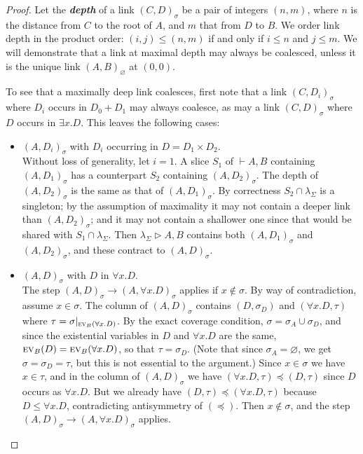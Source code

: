 \documentclass[UKenglish]{lipics-v2016}
\theoremstyle{plain}
\newcommand\defn[1]{\textit{\textbf{#1}}}
\newcommand\ex[2][{}]{\textsc{ev}_{#1}(#2)}
\newcommand\+{+}
\renewcommand\*{\times}
\newcommand\sub{\leq}
\newcommand\dep{\preccurlyeq}
\newcommand\seq[2]{{\vdash}#1,#2}
\newcommand\net[3]{#1\triangleright #2,#3}
\newcommand\res[1]{|_{#1}}
\newcommand\link[3][\sigma]{(#2,#3)_{#1}}
\newcommand\scoal{\rightarrow} %
\begin{document}
\begin{proof}
Let the \defn{depth} of a link $\link CD$ be a pair of integers $(n,m)$, where $n$ is the distance from $C$ to the root of $A$, and $m$ that from $D$ to $B$. We order link depth in the product order: $(i,j)\leq(n,m)$ if and only if $i\leq n$ and $j\leq m$. We will demonstrate that a link at maximal depth may always be coalesced, unless it is the unique link $\link[\varnothing]AB$ at $(0,0)$. 

To see that a maximally deep link coalesces, first note that a link $\link C{D_i}$ where $D_i$ occurs in $D_0{\+}D_1$ may always coalesce, as may a link $\link CD$ where $D$ occurs in $\exists x.D$. This leaves the following cases:
\begin{itemize}
	\item 
$\link A{D_i}$ with $D_i$ occurring in $D=D_1\*D_2$.
\\ 
Without loss of generality, let $i=1$. A slice $S_1$ of $\seq AB$ containing $\link A{D_1}$ has a counterpart $S_2$ containing $\link A{D_2}$. The depth of $\link A{D_2}$ is the same as that of $\link A{D_1}$. By correctness $S_2\cap \lambda_\Sigma$ is a singleton; by the assumption of maximality it may not contain a deeper link than $\link A{D_2}$; and it may not contain a shallower one since that would be shared with $S_1\cap\lambda_\Sigma$. Then $\net{\lambda_\Sigma}AB$ contains both $\link A{D_1}$ and $\link A{D_2}$, and these contract to $\link AD$.
	
	\item 
$\link AD$ with $D$ in $\forall x.D$. 
\\
The step $\link AD\scoal\link A{\forall x.D}$ applies if $x\notin\sigma$. By way of contradiction, assume $x\in\sigma$. The column of $\link AD$ contains $(D,\sigma_D)$ and $(\forall x.D,\tau)$ where $\tau=\sigma\res{\ex[B]{\forall x.D}}$. By the exact coverage condition, $\sigma=\sigma_A\cup\sigma_D$, and since the existential variables in $D$ and $\forall x.D$ are the same, $\ex[B]D=\ex[B]{\forall x.D}$, so that $\tau=\sigma_D$. (Note that since $\sigma_A=\varnothing$, we get $\sigma=\sigma_D=\tau$, but this is not essential to the argument.) Since $x\in\sigma$ we have $x\in\tau$, and in the column of $\link AD$ we have $(\forall x.D,\tau)\dep(D,\tau)$ since $D$ occurs as $\forall x.D$. But we already have $(D,\tau)\dep(\forall x.D,\tau)$ because $D\sub\forall x.D$, contradicting antisymmetry of $(\dep)$. Then $x\notin\sigma$, and the step $\link AD\scoal\link A{\forall x.D}$ applies.


\end{itemize}
\end{proof}
\end{document}
